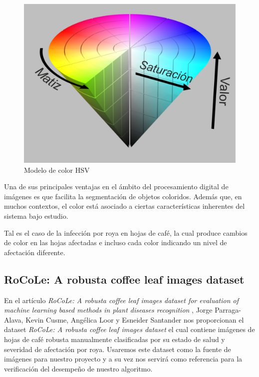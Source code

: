 \begin{figure}[H]
\centering
\includegraphics[scale=0.8]{images/hsv_model.png}
\caption{Modelo de color HSV}
\label{img:polygon}
\end{figure}

Una de sus principales ventajas en el ámbito del procesamiento digital de imágenes es que facilita la segmentación de objetos coloridos. Además que, en muchos contextos, el color está asociado a ciertas características inherentes del sistema bajo estudio.

Tal es el caso de la infección por roya en hojas de café, la cual produce cambios de color en las hojas afectadas e incluso cada color indicando un nivel de afectación diferente.

\subsection{RoCoLe: A robusta coffee leaf images dataset}
En el artículo \textit{RoCoLe: A robusta coffee leaf images dataset for evaluation of machine learning based methods in plant diseases recognition} \cite{PARRAGAALAVA2019104414}, Jorge Parraga-Alava, Kevin Cusme, Angélica Loor y Esneider Santander nos proporcionan el dataset \textit{RoCoLe: A robusta coffee leaf images dataset} \cite{RoCoLe} el cual contiene imágenes de hojas de café robusta manualmente clasificadas por su estado de salud y severidad de afectación por roya. Usaremos este dataset como la fuente de imágenes para nuestro proyecto y a su vez nos servirá como referencia para la verificación del desempeño de nuestro algoritmo.

